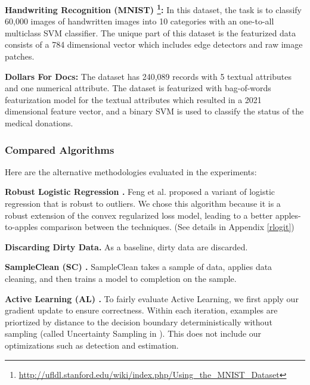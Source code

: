 \vspace{0.25em}

\noindent\textbf{Handwriting Recognition (MNIST) \footnote{\scriptsize\url{http://ufldl.stanford.edu/wiki/index.php/Using_the_MNIST_Dataset}}: } In this dataset, the task is to classify 60,000 images of handwritten images into 10 categories with an one-to-all multiclass SVM classifier. The unique part of this dataset is the featurized data consists of a 784 dimensional vector which includes edge detectors and raw image patches. 

\vspace{0.25em}

\noindent\textbf{Dollars For Docs: } The dataset has 240,089 records with 5 textual attributes and one numerical attribute.
The dataset is featurized with bag-of-words featurization model for the textual attributes which resulted in a 2021 dimensional feature vector, and a binary SVM is used to classify the status of the medical donations.

\subsubsection{Compared Algorithms}
\noindent Here are the alternative methodologies evaluated in the experiments:

\vspace{0.25em}

\noindent\textbf{Robust Logistic Regression \cite{feng2014robust}. } Feng et al. proposed a variant of logistic regression that is robust to outliers. We chose this algorithm because it is a robust extension of the convex regularized loss model, leading to a better apples-to-apples comparison between the techniques. (See details in Appendix \ref{rlogit})  

\vspace{0.25em}

\noindent\textbf{Discarding Dirty Data. } As a baseline, dirty data are discarded.

\vspace{0.25em}

\noindent\textbf{SampleClean (SC) \cite{wang1999sample}. } SampleClean takes a sample of data, applies data cleaning, and then trains a model to completion on the sample.

\vspace{0.25em}

\noindent\textbf{Active Learning (AL) \cite{guillory2009active}. } To fairly evaluate Active Learning, we first apply our gradient update to ensure correctness.
Within each iteration, examples are priortized by distance to the decision boundary deterministically without sampling (called Uncertainty Sampling in \cite{settles2010active}).
This does not include our optimizations such as detection and estimation.

